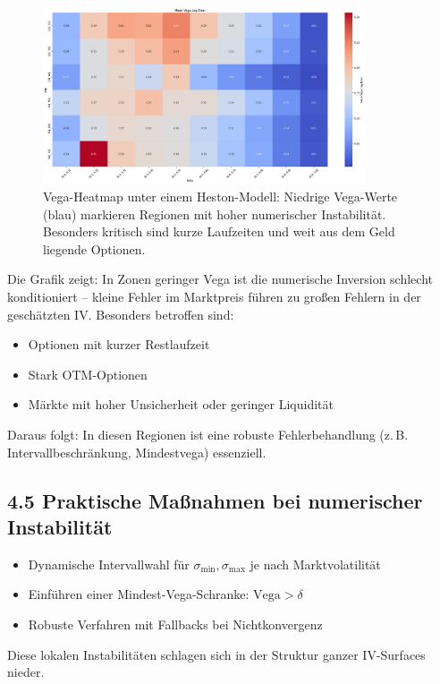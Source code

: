 \documentclass[a4paper,12pt]{article}
\begin{document}
\begin{figure}[h]
    \centering
    \includegraphics[width=0.85\textwidth]{heston_vega_heatmap.png}
    \caption{Vega-Heatmap unter einem Heston-Modell: Niedrige Vega-Werte (blau) markieren Regionen mit hoher numerischer Instabilität. Besonders kritisch sind kurze Laufzeiten und weit aus dem Geld liegende Optionen.}
\end{figure}

Die Grafik zeigt: In Zonen geringer Vega ist die numerische Inversion schlecht konditioniert – kleine Fehler im Marktpreis führen zu großen Fehlern in der geschätzten IV. Besonders betroffen sind:

\begin{itemize}
  \item Optionen mit kurzer Restlaufzeit
  \item Stark OTM-Optionen
  \item Märkte mit hoher Unsicherheit oder geringer Liquidität
\end{itemize}

Daraus folgt: In diesen Regionen ist eine robuste Fehlerbehandlung (z.\,B. Intervallbeschränkung, Mindestvega) essenziell.

\subsection*{4.5 Praktische Maßnahmen bei numerischer Instabilität}

\begin{itemize}
  \item Dynamische Intervallwahl für $\sigma_{\min}, \sigma_{\max}$ je nach Marktvolatilität
  \item Einführen einer Mindest-Vega-Schranke: $\text{Vega} > \delta$
  \item Robuste Verfahren mit Fallbacks bei Nichtkonvergenz
\end{itemize}
Diese lokalen Instabilitäten schlagen sich in der Struktur ganzer IV-Surfaces nieder.
\end{document}
